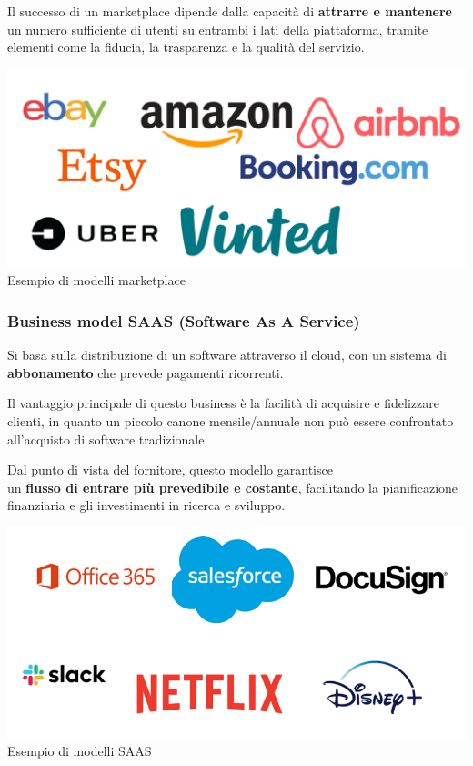 \documentclass[14pt]{extarticle}
\begin{document}
Il successo di un marketplace dipende dalla capacità di \textbf{attrarre e
mantenere} un numero sufficiente di utenti su entrambi i lati della piattaforma,
tramite elementi come la fiducia, la trasparenza e la qualità del servizio.

\begin{center}
    \includegraphics[scale=0.50]{images/marketplace.png}
    Esempio di modelli marketplace
\end{center}

\newpage
\subsubsection{Business model SAAS (Software As A Service)}

Si basa sulla distribuzione di un software attraverso il cloud, con un sistema
di \textbf{abbonamento} che prevede pagamenti ricorrenti.

Il vantaggio principale di questo business è la facilità di acquisire e
fidelizzare clienti, in quanto un piccolo canone mensile/annuale non può essere
confrontato all'acquisto di software tradizionale.

Dal punto di vista del fornitore, questo modello garantisce \\un \textbf{flusso
di entrare più prevedibile e costante}, facilitando la pianificazione
finanziaria e gli investimenti in ricerca e sviluppo.

\begin{center}
    \includegraphics[scale=0.60]{images/saas.png}
    Esempio di modelli SAAS
\end{center}
\end{document}
